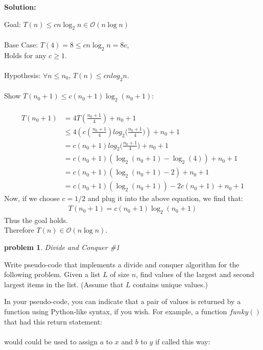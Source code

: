 \documentclass[10pt]{article}
\newtheorem{problem}{\sc\color{cit}problem}
\begin{document}
\begin{enumerate}
    	\textbf{Solution:}
    	
    	Goal: $T(n) \leq cn\log_2{n} \in \mathcal{O}(n\log{n})$ \\ \\
    	Base Case: $T(4) = 8 \leq cn\log_2{n} = 8c$, \\
    	Holds for any $c \geq 1$. \\ \\
    	Hypothesis: $\forall n \leq n_0$, $T(n) \leq cnlog_2{n}$. \\ \\
    	Show $T(n_0 + 1) \leq c(n_0 + 1)\log_2{(n_0 + 1)}$: \\ \\
    	\begin{align*}
    	    T(n_0 + 1) &= 4T(\frac{n_0 + 1}{4}) + n_0 + 1 \\
    	    &\leq 4\left(c(\frac{n_0 + 1}{4})log_2{(\frac{n_0 + 1}{4}})\right) + n_0 + 1 \\
    	    &= c(n_0 + 1)log_2{(\frac{n_0 + 1}{4}}) + n_0 + 1 \\
    	    &= c(n_0 + 1)\left(\log_2(n_0 + 1) - \log_2(4)\right) + n_0 + 1 \\
    	    &= c(n_0 + 1)\left(\log_2(n_0 + 1) - 2\right) + n_0 + 1 \\
    	    &= c(n_0 + 1)\left(\log_2(n_0 + 1)\right) - 2c(n_0 + 1) + n_0 + 1
    	\end{align*}
        Now, if we choose $c = 1/2$ and plug it into the above equation, we find that: 
    	\begin{align*}
    	    T(n_0 + 1) = c(n_0 + 1)\log_2{(n_0 + 1)}
    	\end{align*}
    	Thus the goal holds. \\
    	Therefore $T(n) \in \mathcal{O}(n\log{n})$.
      \end{enumerate}   
      
      
\pagebreak

 \begin{problem} Divide and Conquer \#1\end{problem}
    
\noindent
Write pseudo-code that implements a divide and conquer algorithm for the following problem.  Given a list $L$ of size $n$,  find values of the largest and second largest items in the list.  (Assume that $L$ contains unique values.)
	
	In your pseudo-code,  you can indicate that a pair of values is returned by a function using Python-like syntax, if you wish.  For example,  a function $funky()$ that had this return statement: \\
	\hspace*{3em}{\tt return a, b} \\
	would could be used to assign $a$ to $x$ and $b$ to $y$ if called this way: \\
	\hspace*{3em}{\tt (x, y) = funky()} \\
	
\end{document}
